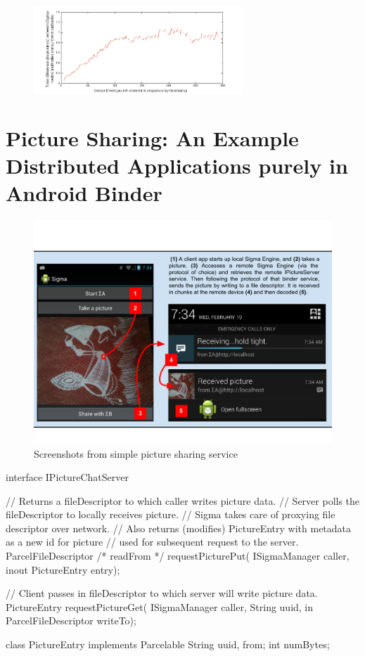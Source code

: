 \documentclass[prodmode]{acmlarge}
\begin{document}
\begin{figure}[h]
\centering
\includegraphics[width=0.7\textwidth]{plots/limited_bandwidth_increasing_latency.png}
\end{figure}

\section{Picture Sharing: An Example Distributed Applications purely in Android Binder}

\begin{figure}[h]
\centering
\includegraphics[width=\textwidth]{drawings/PictureChatExample.pdf}
\caption{Screenshots from simple picture sharing service}
\label{sec:ExampleApplication}
\end{figure}

\begin{snippet}
interface IPictureChatServer {
  // Returns a fileDescriptor to which caller writes picture data.
  // Server polls the fileDescriptor to locally receives picture.
  // Sigma takes care of proxying file descriptor over network.
  // Also returns (modifies) PictureEntry with metadata as a new id for picture
  // used for subsequent request to the server.
  ParcelFileDescriptor /* readFrom */ requestPicturePut(
    ISigmaManager caller, inout PictureEntry entry);

  // Client passes in fileDescriptor to which server will write picture data.
  PictureEntry requestPictureGet(
    ISigmaManager caller, String uuid, in ParcelFileDescriptor writeTo);
}

class PictureEntry implements Parcelable {
    String uuid, from;
    int numBytes;
}
\end{snippet}
\end{document}
